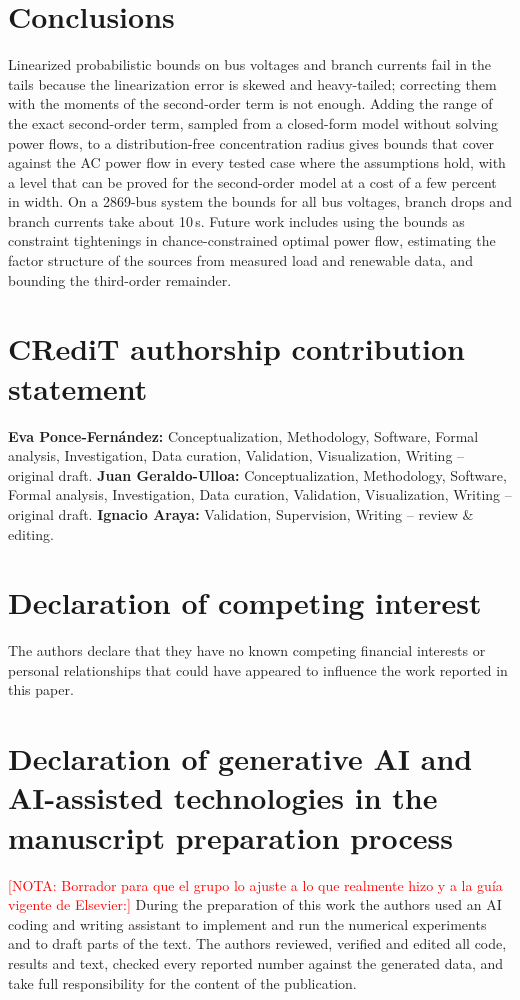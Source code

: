 \documentclass[preprint,12pt]{elsarticle}
\newcommand{\nota}[1]{\textcolor{red}{[NOTA: #1]}}
\begin{document}
\section{Conclusions}\label{sec:conclusion}
Linearized probabilistic bounds on bus voltages and branch currents fail in the tails because the linearization
error is skewed and heavy-tailed; correcting them with the moments of the second-order term is not enough. Adding
the range of the exact second-order term, sampled from a closed-form model without solving power flows, to a
distribution-free concentration radius gives bounds that cover against the AC power flow in every tested case where
the assumptions hold, with a level that can be proved for the second-order model at a cost of a few percent in width.
On a 2869-bus system the bounds for all bus voltages, branch drops and branch currents take about 10\,s.
Future work includes using the bounds as constraint tightenings in chance-constrained optimal power flow, estimating
the factor structure of the sources from measured load and renewable data, and bounding the third-order remainder.

\section*{CRediT authorship contribution statement}
\textbf{Eva Ponce-Fernández:} Conceptualization, Methodology, Software, Formal analysis, Investigation, Data curation, Validation, Visualization, Writing -- original draft.
\textbf{Juan Geraldo-Ulloa:} Conceptualization, Methodology, Software, Formal analysis, Investigation, Data curation, Validation, Visualization, Writing -- original draft.
\textbf{Ignacio Araya:} Validation, Supervision, Writing -- review \& editing.

\section*{Declaration of competing interest}
The authors declare that they have no known competing financial interests or personal relationships that could
have appeared to influence the work reported in this paper.

\section*{Declaration of generative AI and AI-assisted technologies in the manuscript preparation process}
\nota{Borrador para que el grupo lo ajuste a lo que realmente hizo y a la guía vigente de Elsevier:}
During the preparation of this work the authors used an AI coding and writing assistant to implement and run the
numerical experiments and to draft parts of the text. The authors reviewed, verified and edited all code, results and
text, checked every reported number against the generated data, and take full responsibility for the content of the
publication.
\end{document}
